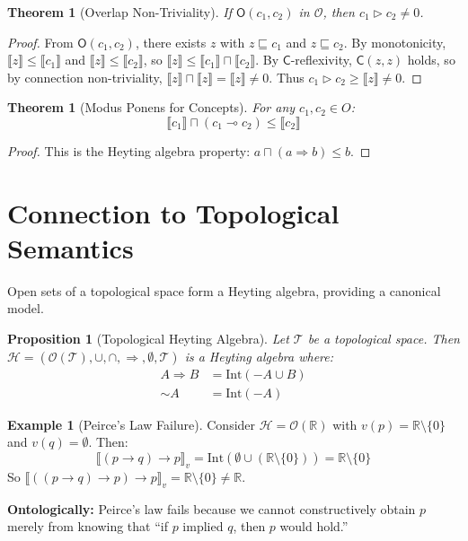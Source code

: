 \documentclass[12pt,a4paper]{article}
\theoremstyle{definition}
\newtheorem{exemplo}[definicao]{Example}
\theoremstyle{plain}
\newtheorem{teorema}[definicao]{Theorem}
\newtheorem{proposicao}[definicao]{Proposition}
\theoremstyle{remark}
\newcommand{\sem}[1]{\llbracket #1 \rrbracket}
\begin{document}
\begin{teorema}[Overlap Non-Triviality]
If $\mathsf{O}(c_1, c_2)$ in $\mathcal{O}$, then $c_1 \triangleright c_2 \neq 0$.
\end{teorema}

\begin{proof}
From $\mathsf{O}(c_1, c_2)$, there exists $z$ with $z \sqsubseteq c_1$ and $z \sqsubseteq c_2$. By monotonicity, $\sem{z} \leq \sem{c_1}$ and $\sem{z} \leq \sem{c_2}$, so $\sem{z} \leq \sem{c_1} \sqcap \sem{c_2}$. By $\mathsf{C}$-reflexivity, $\mathsf{C}(z, z)$ holds, so by connection non-triviality, $\sem{z} \sqcap \sem{z} = \sem{z} \neq 0$. Thus $c_1 \triangleright c_2 \geq \sem{z} \neq 0$.
\end{proof}

\begin{teorema}[Modus Ponens for Concepts]
For any $c_1, c_2 \in O$:
$$
\sem{c_1} \sqcap (c_1 \multimap c_2) \leq \sem{c_2}
$$
\end{teorema}

\begin{proof}
This is the Heyting algebra property: $a \sqcap (a \Rightarrow b) \leq b$.
\end{proof}

\section{Connection to Topological Semantics}

Open sets of a topological space form a Heyting algebra, providing a canonical model.

\begin{proposicao}[Topological Heyting Algebra]
Let $\mathcal{T}$ be a topological space. Then $\mathcal{H} = (\mathcal{O}(\mathcal{T}), \cup, \cap, \Rightarrow, \emptyset, \mathcal{T})$ is a Heyting algebra where:
\begin{align*}
    A \Rightarrow B &= \mathrm{Int}(-A \cup B) \\
    \sim A &= \mathrm{Int}(-A)
\end{align*}
\end{proposicao}

\begin{exemplo}[Peirce's Law Failure]
Consider $\mathcal{H} = \mathcal{O}(\mathbb{R})$ with $v(p) = \mathbb{R} \setminus \{0\}$ and $v(q) = \emptyset$. Then:
$$
\sem{(p \to q) \to p}_v = \mathrm{Int}(\emptyset \cup (\mathbb{R} \setminus \{0\})) = \mathbb{R} \setminus \{0\}
$$
So $\sem{((p \to q) \to p) \to p}_v = \mathbb{R} \setminus \{0\} \neq \mathbb{R}$.

\textbf{Ontologically:} Peirce's law fails because we cannot constructively obtain $p$ merely from knowing that ``if $p$ implied $q$, then $p$ would hold.''
\end{exemplo}
\end{document}

